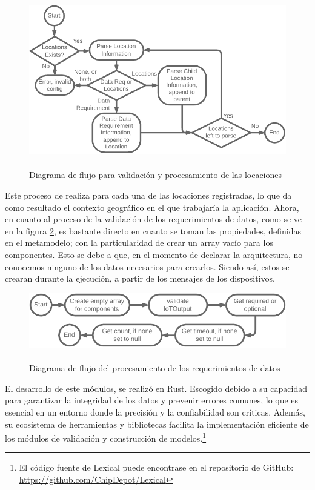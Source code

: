 \begin{figure}[ht]
    \centering
    \caption{\\Diagrama de flujo para validación y procesamiento de las locaciones}
    \label{fig:LexicalLocations}
    \includegraphics[width=\linewidth]{images/LexicalLocationsFlow.pdf}
\end{figure}


Este proceso de realiza para cada una de las locaciones registradas, lo que da como resultado el contexto geográfico en el que trabajaría la aplicación. Ahora, en cuanto al proceso de la validación de los requerimientos de datos, como se ve en la figura \ref{fig:LexicalDataReq}, es bastante directo en cuanto se toman las propiedades, definidas en el metamodelo; con la particularidad de crear un array vacío para los componentes. Esto se debe a que, en el momento de declarar la arquitectura, no conocemos ninguno de los datos necesarios para crearlos. Siendo así, estos se crearan durante la ejecución, a partir de los mensajes de los dispositivos.

\begin{figure}[ht]
    \centering
    \caption{\\Diagrama de flujo del procesamiento de los requerimientos de datos}
    \label{fig:LexicalDataReq}
    \includegraphics[width=0.9\linewidth]{images/LexicalDataRqeFlow.pdf}
\end{figure}

El desarrollo de este módulos, se realizó en Rust. Escogido debido a su capacidad para garantizar la integridad de los datos y prevenir errores comunes, lo que es esencial en un entorno donde la precisión y la confiabilidad son críticas. Además, su ecosistema de herramientas y bibliotecas facilita la implementación eficiente de los módulos de validación y construcción de modelos.\footnote{El código fuente de Lexical puede encontrase en el repositorio de GitHub: \url{https://github.com/ChipDepot/Lexical}}

